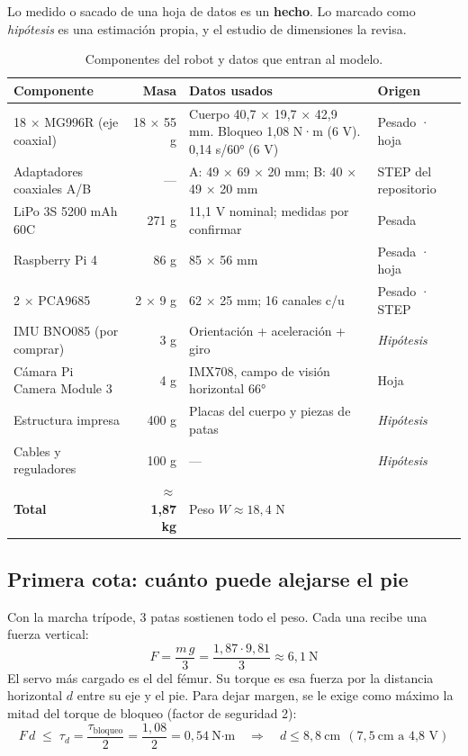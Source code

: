 \documentclass[11pt,a4paper]{article}
\begin{document}
Lo medido o sacado de una hoja de datos es un \textbf{hecho}. Lo marcado como \emph{hipótesis} es una estimación propia, y el estudio de dimensiones la revisa.

\begin{table}[H]
\centering\small
\begin{tabularx}{\linewidth}{@{}l r Y l@{}}
\toprule
\textbf{Componente} & \textbf{Masa} & \textbf{Datos usados} & \textbf{Origen}\\
 × MG996R (eje coaxial) & 18 × 55 g & Cuerpo 40,7 × 19,7 × 42,9 mm. Bloqueo 1,08 N·m (6 V). 0,14 s/60° (6 V) & Pesado · hoja\\
Adaptadores coaxiales A/B & --- & A: 49 × 69 × 20 mm; B: 40 × 49 × 20 mm & STEP del repositorio\\
LiPo 3S 5200 mAh 60C & 271 g & 11,1 V nominal; medidas por confirmar & Pesada\\
Raspberry Pi 4 & 86 g & 85 × 56 mm & Pesada · hoja\\
2 × PCA9685 & 2 × 9 g & 62 × 25 mm; 16 canales c/u & Pesado · STEP\\
IMU BNO085 (por comprar) & 3 g & Orientación + aceleración + giro & \emph{Hipótesis}\\
Cámara Pi Camera Module 3 & 4 g & IMX708, campo de visión horizontal 66° & Hoja\\
Estructura impresa & 400 g & Placas del cuerpo y piezas de patas & \emph{Hipótesis}\\
Cables y reguladores & 100 g & --- & \emph{Hipótesis}\\
\midrule
\textbf{Total} & \textbf{$\approx$ 1,87 kg} & Peso $W \approx 18{,}4$ N & \\
\bottomrule
\end{tabularx}
\caption{Componentes del robot y datos que entran al modelo.}
\end{table}

\subsection{Primera cota: cuánto puede alejarse el pie}

Con la marcha trípode, 3 patas sostienen todo el peso. Cada una recibe una fuerza vertical:
\begin{equation}
F = \frac{m\,g}{3} = \frac{1{,}87 \cdot 9{,}81}{3} \approx 6{,}1\ \text{N}
\end{equation}
El servo más cargado es el del fémur. Su torque es esa fuerza por la distancia horizontal $d$ entre su eje y el pie. Para dejar margen, se le exige como máximo la mitad del torque de bloqueo (factor de seguridad 2):
\begin{equation}
F\,d \;\leq\; \tau_d = \frac{\tau_{\text{bloqueo}}}{2} = \frac{1{,}08}{2} = 0{,}54\ \text{N·m}
\quad\Rightarrow\quad d \leq 8{,}8\ \text{cm}\ \ (7{,}5\ \text{cm a 4,8 V})
\end{equation}
\end{document}
